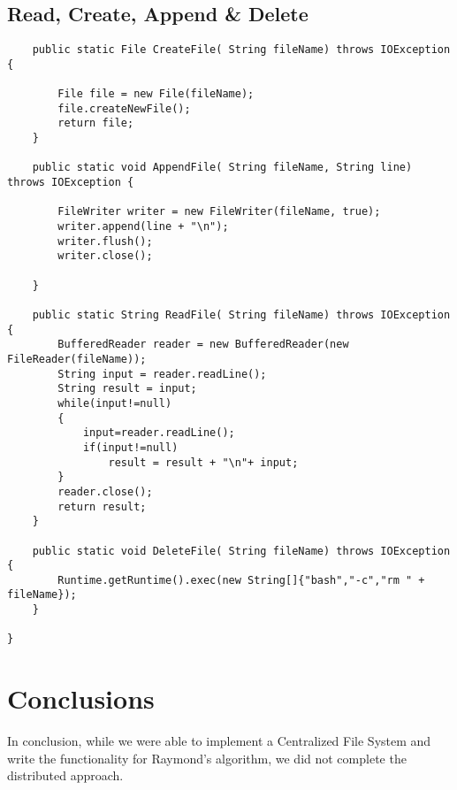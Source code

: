 \documentclass{article}
\begin{document}
	\subsection{Read, Create, Append \& Delete}
	\begin{lstlisting}
	public static File CreateFile( String fileName) throws IOException {
		
		File file = new File(fileName);
		file.createNewFile();
		return file;
	}

	public static void AppendFile( String fileName, String line) throws IOException {

		FileWriter writer = new FileWriter(fileName, true);
		writer.append(line + "\n");
		writer.flush();
		writer.close();
		
	}
	
	public static String ReadFile( String fileName) throws IOException {
		BufferedReader reader = new BufferedReader(new FileReader(fileName));
		String input = reader.readLine();
		String result = input;
		while(input!=null)
		{
			input=reader.readLine();
			if(input!=null)
				result = result + "\n"+ input;
		}
		reader.close();
		return result;
	}

	public static void DeleteFile( String fileName) throws IOException {
		Runtime.getRuntime().exec(new String[]{"bash","-c","rm " + fileName});
	}

}
		\end{lstlisting}
\section{Conclusions}	
In conclusion, while we were able to implement a Centralized File System and write the functionality for Raymond's algorithm, we did not complete the distributed approach.

\end{document}
